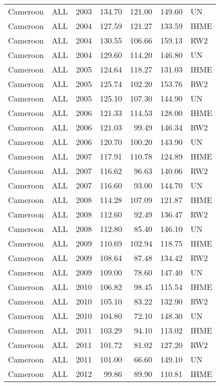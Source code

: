 \begin{longtable}{lllrrrl}
  Cameroon & ALL & 2003 & 134.70 & 121.00 & 149.60 & UN \\ 
  Cameroon & ALL & 2004 & 127.59 & 121.27 & 133.59 & IHME \\ 
  Cameroon & ALL & 2004 & 130.55 & 106.66 & 159.13 & RW2 \\ 
  Cameroon & ALL & 2004 & 129.60 & 114.20 & 146.80 & UN \\ 
  Cameroon & ALL & 2005 & 124.64 & 118.27 & 131.03 & IHME \\ 
  Cameroon & ALL & 2005 & 125.74 & 102.20 & 153.76 & RW2 \\ 
  Cameroon & ALL & 2005 & 125.10 & 107.30 & 144.90 & UN \\ 
  Cameroon & ALL & 2006 & 121.33 & 114.53 & 128.00 & IHME \\ 
  Cameroon & ALL & 2006 & 121.03 & 99.49 & 146.34 & RW2 \\ 
  Cameroon & ALL & 2006 & 120.70 & 100.20 & 143.90 & UN \\ 
  Cameroon & ALL & 2007 & 117.91 & 110.78 & 124.89 & IHME \\ 
  Cameroon & ALL & 2007 & 116.62 & 96.63 & 140.06 & RW2 \\ 
  Cameroon & ALL & 2007 & 116.60 & 93.00 & 144.70 & UN \\ 
  Cameroon & ALL & 2008 & 114.28 & 107.09 & 121.87 & IHME \\ 
  Cameroon & ALL & 2008 & 112.60 & 92.49 & 136.47 & RW2 \\ 
  Cameroon & ALL & 2008 & 112.80 & 85.40 & 146.10 & UN \\ 
  Cameroon & ALL & 2009 & 110.69 & 102.94 & 118.75 & IHME \\ 
  Cameroon & ALL & 2009 & 108.64 & 87.48 & 134.42 & RW2 \\ 
  Cameroon & ALL & 2009 & 109.00 & 78.60 & 147.40 & UN \\ 
  Cameroon & ALL & 2010 & 106.82 & 98.45 & 115.54 & IHME \\ 
  Cameroon & ALL & 2010 & 105.10 & 83.22 & 132.90 & RW2 \\ 
  Cameroon & ALL & 2010 & 104.80 & 72.10 & 148.30 & UN \\ 
  Cameroon & ALL & 2011 & 103.29 & 94.10 & 113.02 & IHME \\ 
  Cameroon & ALL & 2011 & 101.72 & 81.02 & 127.20 & RW2 \\ 
  Cameroon & ALL & 2011 & 101.00 & 66.60 & 149.10 & UN \\ 
  Cameroon & ALL & 2012 & 99.86 & 89.90 & 110.81 & IHME \\ 

\end{longtable}
